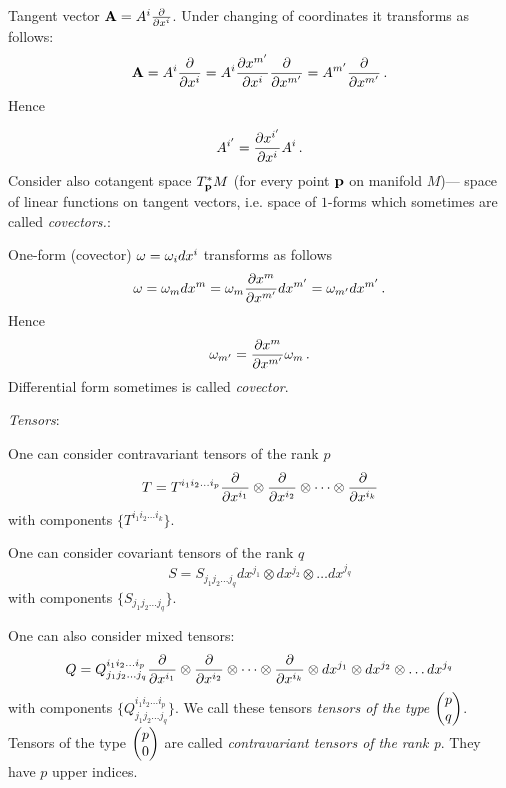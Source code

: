 \documentclass[12pt]{article}
\theoremstyle{theorem}
\numberwithin{equation}{section}
\begin{document}
 Tangent vector ${\bf A}=A^i{\partial\over \partial x^i}$.
Under changing of coordinates it transforms as follows:
             $$
         {\bf A}=A^i{\partial\over \partial x^i}=
A^i{\partial x^{m'}\over \partial x^i}{\partial\over \partial x^{m'}}=A^{m'}{\partial\over \partial x^{m'}}\,.
             $$
  Hence

            \begin{equation}\label{transformofvector}
                   A^{i'}={\partial x^{i'}\over \partial x^i}A^i\,.
            \end{equation}
              Consider also cotangent space $T^*_{\bf p} M$
(for every point ${\bf p}$ on manifold $M$)---
              space of linear functions on tangent vectors, i.e. space of $1$-forms which sometimes are called
              {\it covectors.}:

         One-form (covector) $\omega=\omega_idx^i$ transforms as follows
            $$
      \omega=\omega_m dx^m=\omega_m {\partial x^m\over \partial x^{m'}}dx^{m'}=\omega_{m'}dx^{m'}\,.
        $$
      Hence
         \begin{equation}\label{transformofoneform}
            \omega_{m'}={\partial x^{m}\over \partial x^{m'}}\omega_m\,.
         \end{equation}
Differential form sometimes is called {\it covector}.

          {\it Tensors}:
\smallskip

One can consider contravariant tensors  of the rank $p$
                   $$
             T=  T^{i_1i_2\dots i_p}{\partial\over \partial x^{i_1}}\otimes
             {\partial\over \partial x^{i_2}}\otimes \dots \otimes {\partial\over \partial x^{i_k}}
                   $$
with components $\{T^{i_1i_2\dots i_k}\}$.


One can consider covariant tensors  of the rank $q$
                   $$
             S=  S_{j_1j_2\dots j_q}dx^{j_1}\otimes
              dx^{j_2}\otimes \dots dx^{j_q}
                   $$
with components $\{S_{j_1j_2\dots j_q}\}$.

One can also consider mixed tensors:
          $$
        Q=Q^{i_1i_2\dots i_p}_{j_1j_2\dots j_q}{\partial\over \partial x^{i_1}}\otimes
             {\partial\over \partial x^{i_2}}\otimes \dots \otimes {\partial\over \partial x^{i_k}}\otimes
             dx^{j_1}\otimes
              dx^{j_2}\otimes \dots dx^{j_q}
          $$
with components $\{Q^{i_1i_2\dots i_p}_{j_1j_2\dots j_q}\}$.
We call these tensors
{\it tensors of the type  $\begin{pmatrix} p\cr q\cr\end{pmatrix}$}.
Tensors of the type $\begin{pmatrix} p\cr 0\cr\end{pmatrix}$ are called
{\it contravariant tensors of the rank p}.
They have $p$ upper indices.
\end{document}
